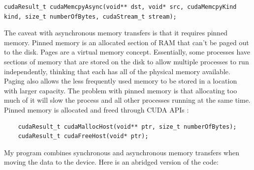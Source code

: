 \begin{verbatim}
cudaResult_t cudaMemcpyAsync(void** dst, void* src, cudaMemcpyKind kind, size_t numberOfBytes, cudaStream_t stream);
\end{verbatim}
    
The caveat with asynchronous memory transfers is that it requires pinned memory. Pinned memory is an allocated section of RAM that can't be paged out to the disk. Pages are a virtual memory concept. Essentially, some processes have sections of memory that are stored on the disk to allow multiple processes to run independently, thinking that each has all of the physical memory available. Paging also allows the less frequently used memory to be stored in a location with larger capacity. The problem with pinned memory is that allocating too much of it will slow the process and all other processes running at the same time. Pinned memory is allocated and freed through CUDA APIs \citep{cudaC}:

\begin{verbatim}
    cudaResult_t cudaMallocHost(void** ptr, size_t numberOfBytes);
    cudaResult_t cudaFreeHost(void* ptr);
\end{verbatim}

My program combines synchronous and asynchronous memory transfers when moving the data to the device. Here is an abridged version of the code:


